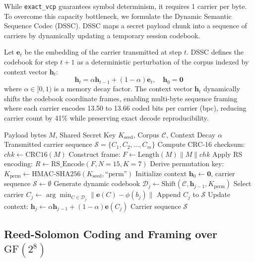\documentclass[11pt,journal,onecolumn]{IEEEtran}\linespread{1.3}
\begin{document}
While \texttt{exact\_vcp} guarantees symbol determinism, it requires 1 carrier per byte. To overcome this capacity bottleneck, we formulate the Dynamic Semantic Sequence Codec (DSSC). DSSC maps a secret payload chunk into a sequence of carriers by dynamically updating a temporary session codebook.

Let $\mathbf{e}_t$ be the embedding of the carrier transmitted at step $t$. DSSC defines the codebook for step $t+1$ as a deterministic perturbation of the corpus indexed by context vector $\mathbf{h}_t$:
\begin{equation}
\mathbf{h}_t = \alpha \mathbf{h}_{t-1} + (1-\alpha) \mathbf{e}_t, \quad \mathbf{h}_0 = \mathbf{0}
\end{equation}
where $\alpha \in [0, 1)$ is a memory decay factor. The context vector $\mathbf{h}_t$ dynamically shifts the codebook coordinate frames, enabling multi-byte sequence framing where each carrier encodes 13.50 to 13.66 coded bits per carrier (bpc), reducing carrier count by 41\% while preserving exact decode reproducibility.

\begin{algorithm}[t]
\caption{Dynamic Semantic Sequence Encoding}
\label{alg:dssc}
\begin{algorithmic}[1]
\REQUIRE Payload bytes $M$, Shared Secret Key $K_{\text{seed}}$, Corpus $\mathcal{C}$, Context Decay $\alpha$
\ENSURE Transmitted carrier sequence $\mathcal{S} = \{C_1, C_2, \dots, C_m\}$
\STATE Compute CRC-16 checksum: $chk \leftarrow \text{CRC16}(M)$
\STATE Construct frame: $F \leftarrow \text{Length}(M) \parallel M \parallel chk$
\STATE Apply RS encoding: $R \leftarrow \text{RS\_Encode}(F, N=15, K=7)$
\STATE Derive permutation key: $K_{\text{perm}} \leftarrow \text{HMAC-SHA256}(K_{\text{seed}}, \text{``perm''})$
\STATE Initialize context $\mathbf{h}_0 \leftarrow \mathbf{0}$, carrier sequence $\mathcal{S} \leftarrow \emptyset$
    \STATE Generate dynamic codebook $\mathcal{D}_j \leftarrow \text{Shift}(\mathcal{C}, \mathbf{h}_{j-1}, K_{\text{perm}})$
    \STATE Select carrier $C_j \leftarrow \arg\min_{C \in \mathcal{D}_j} \|\mathbf{e}(C) - \phi(b_j)\|$
    \STATE Append $C_j$ to $\mathcal{S}$
    \STATE Update context: $\mathbf{h}_j \leftarrow \alpha \mathbf{h}_{j-1} + (1-\alpha) \mathbf{e}(C_j)$
\ENDFOR
\RETURN Carrier sequence $\mathcal{S}$
\end{algorithmic}
\end{algorithm}

\subsection{Reed-Solomon Coding and Framing over $\text{GF}(2^8)$}
\end{document}
